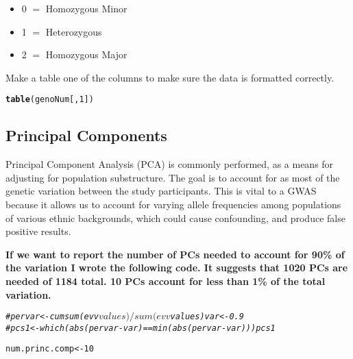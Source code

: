 \documentclass[11pt]{article}\usepackage[]{graphicx}\usepackage[]{color}
\makeatletter
\newcommand{\hlnum}[1]{\textcolor[rgb]{0.686,0.059,0.569}{#1}}%
\newcommand{\hlcom}[1]{\textcolor[rgb]{0.678,0.584,0.686}{\textit{#1}}}%
\newcommand{\hlstd}[1]{\textcolor[rgb]{0.345,0.345,0.345}{#1}}%
\newcommand{\hlkwb}[1]{\textcolor[rgb]{0.69,0.353,0.396}{#1}}%
\newcommand{\hlkwd}[1]{\textcolor[rgb]{0.737,0.353,0.396}{\textbf{#1}}}%
\newenvironment{kframe}{%
 \def\at@end@of@kframe{}%
 \ifinner\ifhmode%
  \def\at@end@of@kframe{\end{minipage}}%
  \begin{minipage}{\columnwidth}%
 \fi\fi%
 \def\FrameCommand##1{\hskip\@totalleftmargin \hskip-\fboxsep
 \colorbox{shadecolor}{##1}\hskip-\fboxsep
     \hskip-\linewidth \hskip-\@totalleftmargin \hskip\columnwidth}%
 \MakeFramed {\advance\hsize-\width
   \@totalleftmargin\z@ \linewidth\hsize
   \@setminipage}}%
 {\par\unskip\endMakeFramed%
 \at@end@of@kframe}
\newenvironment{knitrout}{}{} %
\makeatother
\begin{document}
\begin{itemize}
  \item 0 $=$ Homozygous Minor
  \item 1 $=$ Heterozygous
  \item 2 $=$ Homozygous Major
\end{itemize}

Make a table one of the columns to make sure the data is formatted correctly.
\begin{knitrout}
\color{fgcolor}\begin{kframe}
\begin{alltt}
\hlkwd{table}\hlstd{(genoNum[,} \hlnum{1}\hlstd{])}
\end{alltt}
\end{kframe}
\end{knitrout}

\subsection{Principal Components}
Principal Component Analysis (PCA) is commonly performed, as a means for adjusting for population substructure.  The goal is to account for as most of the genetic variation between the study participants.  This is vital to a GWAS because it allows us to account for varying allele frequencies among populations of various ethnic backgrounds, which could cause confounding, and produce false positive results.

\textbf{If we want to report the number of PCs needed to account for 90\% of the variation I wrote the following code.  It suggests that 1020 PCs are needed of 1184 total.  10 PCs account for less than 1\% of the total variation.}
\begin{knitrout}
\color{fgcolor}\begin{kframe}
\begin{alltt}
\hlcom{# pervar<-cumsum(evv$values)/sum(evv$values) var<-0.9}
\hlcom{# pcs1<-which(abs(pervar-var)==min(abs(pervar-var))) pcs1}
\end{alltt}
\end{kframe}
\end{knitrout}


\begin{knitrout}
\color{fgcolor}\begin{kframe}
\begin{alltt}
\hlstd{num.princ.comp} \hlkwb{<-} \hlnum{10}
\end{alltt}
\end{kframe}
\end{knitrout}
\end{document}
